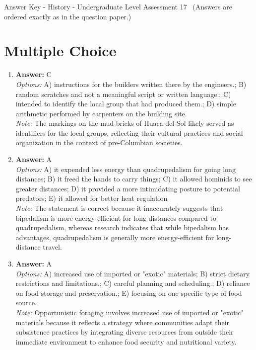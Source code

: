 \documentclass[12pt]{article}
\begin{document}
\begin{center}
Answer Key - History - Undergraduate Level Assessment 17 \
\small (Answers are ordered exactly as in the question paper.)
\end{center}

\section*{Multiple Choice}
\begin{enumerate}[label=\arabic*.]
\item \textbf{Answer:} C
\\ \textit{Options:} A) instructions for the builders written there by the engineers.; B) random scratches and not a meaningful script or written language.; C) intended to identify the local group that had produced them.; D) simple arithmetic performed by carpenters on the building site.
\\ \textit{Note:} The markings on the mud-bricks of Huaca del Sol likely served as identifiers for the local groups, reflecting their cultural practices and social organization in the context of pre-Columbian societies.
\item \textbf{Answer:} A
\\ \textit{Options:} A) it expended less energy than quadrupedalism for going long distances; B) it freed the hands to carry things; C) it allowed hominids to see greater distances; D) it provided a more intimidating posture to potential predators; E) it allowed for better heat regulation
\\ \textit{Note:} The statement is correct because it inaccurately suggests that bipedalism is more energy-efficient for long distances compared to quadrupedalism, whereas research indicates that while bipedalism has advantages, quadrupedalism is generally more energy-efficient for long-distance travel.
\item \textbf{Answer:} A
\\ \textit{Options:} A) increased use of imported or "exotic" materials; B) strict dietary restrictions and limitations.; C) careful planning and scheduling.; D) reliance on food storage and preservation.; E) focusing on one specific type of food source.
\\ \textit{Note:} Opportunistic foraging involves increased use of imported or "exotic" materials because it reflects a strategy where communities adapt their subsistence practices by integrating diverse resources from outside their immediate environment to enhance food security and nutritional variety.

\end{enumerate}
\end{document}
